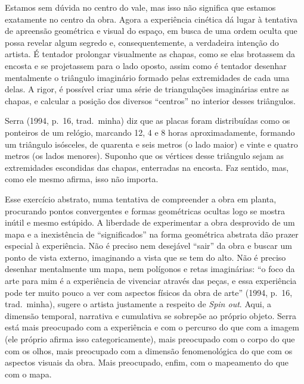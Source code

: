 Estamos sem dúvida no centro do vale, mas isso não significa que estamos
exatamente no centro da obra. Agora a experiência cinética dá lugar à
tentativa de apreensão geométrica e visual do espaço, em busca de uma
ordem oculta que possa revelar algum segredo e, consequentemente, a
verdadeira intenção do artista. É tentador prolongar visualmente as
chapas, como se elas brotassem da encosta e se projetassem para o lado
oposto, assim como é tentador desenhar mentalmente o triângulo
imaginário formado pelas extremidades de cada uma delas. A rigor, é
possível criar uma série de triangulações imaginárias entre as chapas, e
calcular a posição dos diversos ``centros'' no interior desses
triângulos.

Serra (1994, p.~16, trad.~minha) diz que as placas foram distribuídas
como os ponteiros de um relógio, marcando 12, 4 e 8 horas
aproximadamente, formando um triângulo isósceles, de quarenta e seis
metros (o lado maior) e vinte e quatro metros (os lados menores).
Suponho que os vértices desse triângulo sejam as extremidades escondidas
das chapas, enterradas na encosta. Faz sentido, mas, como ele mesmo
afirma, isso não importa.

Esse exercício abstrato, numa tentativa de compreender a obra em planta,
procurando pontos convergentes e formas geométricas ocultas logo se
mostra inútil e mesmo estúpido. A liberdade de experimentar a obra
desprovido de um mapa e a inexistência de ``significados'' na forma
geométrica abstrata dão prazer especial à experiência. Não é preciso nem
desejável ``sair'' da obra e buscar um ponto de vista externo,
imaginando a vista que se tem do alto. Não é preciso desenhar
mentalmente um mapa, nem polígonos e retas imaginárias: ``o foco da arte
para mim é a experiência de vivenciar através das peças, e essa
experiência pode ter muito pouco a ver com aspectos físicos da obra de
arte'' (1994, p.~16, trad.~minha), sugere o artista justamente a
respeito de \emph{Spin out}. Aqui, a dimensão temporal, narrativa e
cumulativa se sobrepõe ao próprio objeto. Serra está mais preocupado com
a experiência e com o percurso do que com a imagem (ele próprio afirma
isso categoricamente), mais preocupado com o corpo do que com os olhos,
mais preocupado com a dimensão fenomenológica do que com os aspectos
visuais da obra. Mais preocupado, enfim, com o mapeamento do que com o
mapa.

